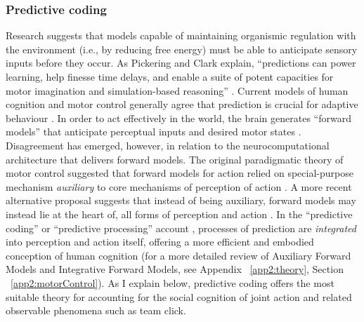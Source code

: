 \begin{CJK}{UTF8}{gbsn}

\subsubsection{Predictive coding\label{sect:predictiveCoding}}
Research suggests that models capable of maintaining organismic regulation with the environment (i.e., by reducing free energy) must be able to anticipate sensory inputs before they occur. As Pickering and Clark explain, ``predictions can power learning, help finesse time delays, and enable a suite of potent capacities for motor imagination and simulation-based reasoning'' \citep[6]{Pickering2014}.  Current models of human cognition and motor control generally agree that prediction is crucial for adaptive behaviour \citep{Wolpert2003,Clark2013}.  In order to act effectively in the world, the brain generates ``forward models'' that anticipate perceptual inputs and desired motor states \citep{Pickering2014}.  Disagreement has emerged, however, in relation to the neurocomputational architecture that delivers forward models.  The original paradigmatic theory of motor control suggested that forward models for action relied on special-purpose mechanism \textit{auxiliary} to core mechanisms of perception of action \citep{Wolpert1997}.  A more recent alternative proposal suggests that instead of being auxiliary, forward models may instead lie at the heart of, all forms of perception and action \citep{Friston2010}.  In the ``predictive coding'' \citep{Rao1999} or ``predictive processing'' account \citep{Clark2013}, processes of prediction are \textit{integrated} into perception and action itself, offering a more efficient and embodied conception of human cognition (for a more detailed review of Auxiliary Forward Models and Integrative Forward Models, see Appendix ~\ref{app2:theory}, Section ~\ref{app2:motorControl}). As I explain below, predictive coding offers the most suitable theory for accounting for the social cognition of joint action and related observable phenomena such as team click.


\end{CJK}
